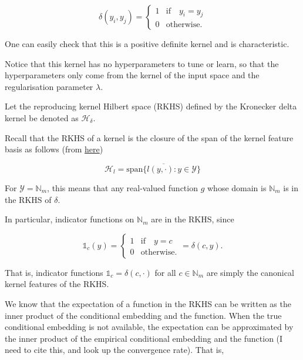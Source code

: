 \documentclass[a4paper, 12pt]{article}
\begin{document}
	\begin{equation}
		\delta(y_{i}, y_{j}) = \begin{cases}
			1 & \mathrm{if } \quad y_{i} = y_{j} \\
			0 & \mathrm{otherwise}.
		\end{cases}
	\end{equation}
	
	One can easily check that this is a positive definite kernel and is characteristic.

	Notice that this kernel has no hyperparameters to tune or learn, so that the hyperparameters only come from the kernel of the input space and the regularisation parameter $\lambda$.
	
	Let the reproducing kernel Hilbert space (RKHS) defined by the Kronecker delta kernel be denoted as $\mathcal{H}_{\delta}$.
	
	Recall that the RKHS of a kernel is the closure of the span of the kernel feature basis as follows (from \href{http://www.jmlr.org/papers/volume10/xu09a/xu09a.pdf}{here})
	
	\begin{equation}
		\mathcal{H}_{l} = \overline{\mathrm{span}\{l(y, \cdot) : y \in \mathcal{Y}\}}
	\end{equation}
	
	For $\mathcal{Y} = \mathbb{N}_{m}$, this means that any real-valued function $g$ whose domain is $\mathbb{N}_{m}$ is in the RKHS of $\delta$.
	
	In particular, indicator functions on $\mathbb{N}_{m}$ are in the RKHS, since
	
	\begin{equation}
		\mathbb{1}_{c}(y) = \begin{cases}
			1 & \mathrm{if } \quad y = c \\
			0 & \mathrm{otherwise}.
		\end{cases} = \delta(c, y).
	\end{equation}
	
	That is, indicator functions $\mathbb{1}_{c} = \delta(c, \cdot)$ for all $c \in \mathbb{N}_{m}$ are simply the canonical kernel features of the RKHS.
	
	We know that the expectation of a function in the RKHS can be written as the inner product of the conditional embedding and the function. When the true conditional embedding is not available, the expectation can be approximated by the inner product of the empirical conditional embedding and the function (I need to cite this, and look up the convergence rate). That is,
	
\end{document}
